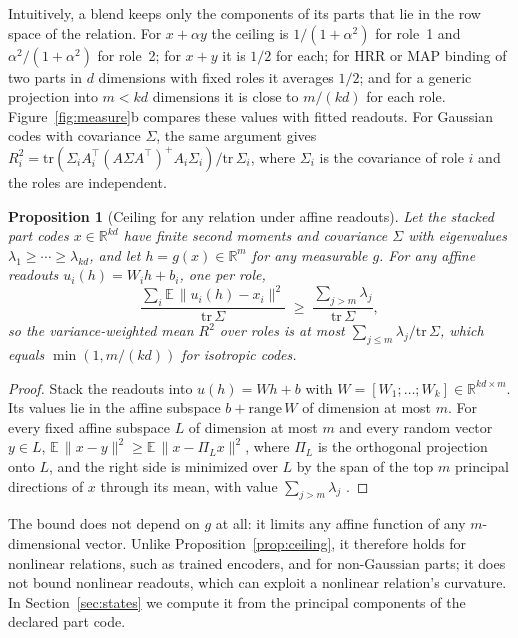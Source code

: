 \documentclass[10pt]{article}
\theoremstyle{plain}
\newtheorem{proposition}{Proposition}
\theoremstyle{remark}
\newcommand{\R}{\mathbb{R}}
\begin{document}
\noindent
Intuitively, a blend keeps only the components of its parts that lie in the row space of the relation. For $x + \alpha y$ the ceiling is $1/(1 + \alpha^2)$ for role~1 and $\alpha^2/(1 + \alpha^2)$ for role~2; for $x + y$ it is $1/2$ for each; for HRR or MAP binding of two parts in $d$ dimensions with fixed roles it averages $1/2$; and for a generic projection into $m < kd$ dimensions it is close to $m/(kd)$ for each role. Figure~\ref{fig:measure}b compares these values with fitted readouts. For Gaussian codes with covariance $\Sigma$, the same argument gives $R^2_i = \mathrm{tr}(\Sigma_i A_i^{\top}(A\Sigma A^{\top})^{+}A_i\Sigma_i)/\mathrm{tr}\,\Sigma_i$, where $\Sigma_i$ is the covariance of role $i$ and the roles are independent.

\begin{proposition}[Ceiling for any relation under affine readouts]
\label{prop:ey}
Let the stacked part codes $x \in \R^{kd}$ have finite second moments and covariance $\Sigma$ with eigenvalues $\lambda_1 \ge \cdots \ge \lambda_{kd}$, and let $h = g(x) \in \R^m$ for any measurable $g$. For any affine readouts $u_i(h) = W_i h + b_i$, one per role,
\begin{equation}
  \frac{\sum_i \mathbb{E}\,\lVert u_i(h) - x_i \rVert^2}{\mathrm{tr}\,\Sigma} \;\ge\; \frac{\sum_{j > m} \lambda_j}{\mathrm{tr}\,\Sigma},
\end{equation}
so the variance-weighted mean $R^2$ over roles is at most $\sum_{j \le m} \lambda_j / \mathrm{tr}\,\Sigma$, which equals $\min(1, m/(kd))$ for isotropic codes.
\end{proposition}

\begin{proof}
Stack the readouts into $u(h) = Wh + b$ with $W = [W_1; \ldots; W_k] \in \R^{kd \times m}$. Its values lie in the affine subspace $b + \mathrm{range}\,W$ of dimension at most $m$. For every fixed affine subspace $L$ of dimension at most $m$ and every random vector $y \in L$, $\mathbb{E}\,\lVert x - y \rVert^2 \ge \mathbb{E}\,\lVert x - \Pi_L x \rVert^2$, where $\Pi_L$ is the orthogonal projection onto $L$, and the right side is minimized over $L$ by the span of the top $m$ principal directions of $x$ through its mean, with value $\sum_{j > m} \lambda_j$ \citep{eckart1936}.
\end{proof}

\noindent
The bound does not depend on $g$ at all: it limits any affine function of any $m$-dimensional vector. Unlike Proposition~\ref{prop:ceiling}, it therefore holds for nonlinear relations, such as trained encoders, and for non-Gaussian parts; it does not bound nonlinear readouts, which can exploit a nonlinear relation's curvature. In Section~\ref{sec:states} we compute it from the principal components of the declared part code.
\end{document}
